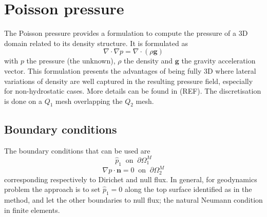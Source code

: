 \section{Poisson pressure} %
\label{sec:poisson_pressure_driver}
The Poisson pressure provides a formulation to compute the pressure of a 3D domain related to its density structure. 
It is formulated as
$$
  \nabla \cdot \nabla p = \nabla \cdot (\rho \boldsymbol g)
$$
with $p$ the pressure (the unknown), $\rho$ the density and $\boldsymbol g$ the gravity acceleration vector.
This formulation presents the advantages of being fully 3D where lateral variations of density are well captured in the resulting pressure field, especially for non-hydrostatic cases.
More details can be found in (REF).
The discretisation is done on a $Q_1$ mesh overlapping the $Q_2$ mesh. 

\subsection{Boundary conditions} %
\label{sub:boundary_conditions}
The boundary conditions that can be used are
$$
  \hat{p}_1 \medspace \text{ on } \medspace \partial \Omega^M_1
$$
$$
  \nabla p \cdot \boldsymbol n = 0 \medspace \text{ on } \medspace \partial \Omega^M_2
$$
corresponding respectively to Dirichet and null flux.
In general, for geodynamics problem the approach is to set $\hat{p}_1 = 0$ along the top surface identified as  in the  method, and let the other boundaries to null flux; the natural Neumann condition in finite elements.

